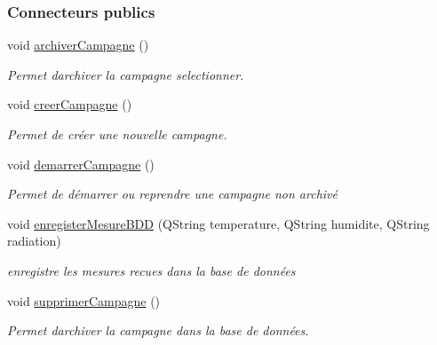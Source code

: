 \subsubsection*{Connecteurs publics}
\begin{DoxyCompactItemize}
\item 
void \hyperlink{class_i_h_m_accueil_a5d38917dbe88751ee966834e1f6c558e}{archiver\+Campagne} ()
\begin{DoxyCompactList}\small\item\em Permet d\textquotesingle{}archiver la campagne selectionner. \end{DoxyCompactList}\item 
void \hyperlink{class_i_h_m_accueil_a1da45b17d6e4198f87a9a0e05d1f7fd5}{creer\+Campagne} ()
\begin{DoxyCompactList}\small\item\em Permet de créer une nouvelle campagne. \end{DoxyCompactList}\item 
void \hyperlink{class_i_h_m_accueil_a6e8935ff4e0ba8f0c0015f370d91eda3}{demarrer\+Campagne} ()
\begin{DoxyCompactList}\small\item\em Permet de démarrer ou reprendre une campagne non archivé \end{DoxyCompactList}\item 
void \hyperlink{class_i_h_m_accueil_af61976178829ec1fc756bec7eff0354d}{enregister\+Mesure\+B\+DD} (Q\+String temperature, Q\+String humidite, Q\+String radiation)
\begin{DoxyCompactList}\small\item\em enregistre les mesures recues dans la base de données \end{DoxyCompactList}\item 
void \hyperlink{class_i_h_m_accueil_a0d7c77277fe83ad13beee56d96c5c5ca}{supprimer\+Campagne} ()
\begin{DoxyCompactList}\small\item\em Permet d\textquotesingle{}archiver la campagne dans la base de données. \end{DoxyCompactList}\end{DoxyCompactItemize}
